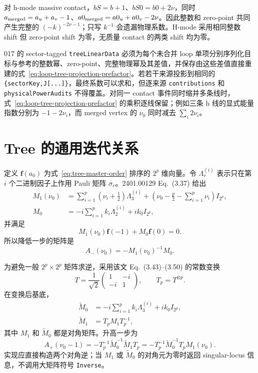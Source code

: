 ﻿\documentclass[a4paper,11pt]{article}
\begin{document}
对 h-mode massive contact，$bS=b+1$、$bS0=b0+2\nu$，同时 $a_{\rm merged}=a_u+a_v-1$、$a0_{\rm merged}=a0_u+a0_v-2\nu$。因此整数和 zero-point 共同产生完整的 $(-k)^{-2\nu-1}$；只写 $k^{-1}$ 会遗漏物理系数。H-mode 采用相同整数 shift 但 zero-point shift 为零，无质量 contact 的两类 shift 均为零。

017 的 sector-tagged \texttt{treeLinearData} 必须为每个未合并 loop 单项分别序列化目标与参考的整数幂、zero-point、完整物理幂及其差值，并保存由这些差值直接重建的式~\eqref{eq:loop-tree-projection-prefactor}。若若干来源投影到相同的 \texttt{\{sectorKey,J[...]\}}，最终系数可以求和，但逐来源 \texttt{contributions} 和 \texttt{physicalPowerAudits} 不得覆盖。对同一 contact 事件同时缩并多条线时，式~\eqref{eq:loop-tree-projection-prefactor} 的乘积逐线保留；例如三条 h 线的显式能量指数分别为 $-1-2\nu_i$，而 merged vertex 的 $\nu_0$ 同时减去 $\sum_i2\nu_i$。

\section{Tree 的通用迭代关系}

定义 $\bm f(a_0)$ 为式~\eqref{eq:tree-master-order} 排序的 $2^p$ 维向量。令 $\Lambda_r^{(i)}$ 表示只在第 $i$ 个二进制因子上作用 Pauli 矩阵 $\sigma_r$。2401.00129 Eq.~(3.37) 给出
\begin{align}
 M_1(\nu_0)
 &=\sum_{i=1}^{p}\left(\nu_i+\frac12\right)\Lambda_3^{(i)}
 +\left(\nu_0-\frac p2-\sum_{i=1}^{p}\nu_i\right)I_{2^p},\\
 M_0
 &=-i\sum_{i=1}^{p}k_i\Lambda_2^{(i)}+ik_0 I_{2^p},
 \label{eq:tree-m10}
\end{align}
并满足
\begin{equation}
 M_1(\nu_0)\bm f(-1)+M_0\bm f(0)=0.
\end{equation}
所以降低一步的矩阵是
\begin{equation}
 A_-(\nu_0)=-M_1(\nu_0)^{-1}M_0.
 \label{eq:tree-aminus}
\end{equation}

为避免一般 $2^p\times2^p$ 矩阵求逆，采用该文 Eq.~(3.43)--(3.50) 的常数变换
\begin{equation}
 T=\frac1{\sqrt2}\begin{pmatrix}1&-i\\-i&1\end{pmatrix},
 \qquad T_p=T^{\otimes p}.
\end{equation}
在变换后基底，
\begin{align}
 \widetilde M_0
 &=-i\sum_{i=1}^{p}k_i\Lambda_3^{(i)}+ik_0I_{2^p},\\
 \widetilde M_1&=T_pM_1T_p^{-1},
\end{align}
其中 $M_1$ 和 $\widetilde M_0$ 都是对角矩阵。升高一步为
\begin{equation}
 A_+(\nu_0-1)
 =-T_p^{-1}\widetilde M_0^{-1}\widetilde M_1T_p
 =-T_p^{-1}\widetilde M_0^{-1}T_pM_1(\nu_0).
 \label{eq:tree-aplus}
\end{equation}
实现应直接构造两个对角逆；当 $M_1$ 或 $\widetilde M_0$ 的对角元为零时返回 singular-locus 信息，不调用大矩阵符号 \texttt{Inverse}。
\end{document}
